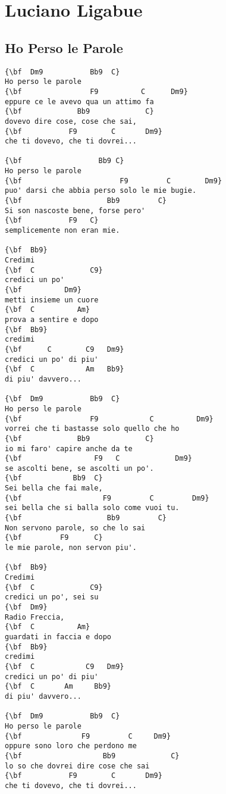 \documentclass[a4paper]{article}
\begin{document}
\section{Luciano Ligabue}
\subsection{Ho Perso le Parole}
\begin{multicols}{2}\begin{Verbatim}[commandchars=\\\{\}]
{\bf  Dm9           Bb9  C}
Ho perso le parole
{\bf                F9          C      Dm9}
eppure ce le avevo qua un attimo fa
{\bf             Bb9             C}
dovevo dire cose, cose che sai,
{\bf           F9        C       Dm9}
che ti dovevo, che ti dovrei...

{\bf                  Bb9 C}
Ho perso le parole
{\bf                       F9         C        Dm9}
puo' darsi che abbia perso solo le mie bugie.
{\bf                    Bb9         C}
Si son nascoste bene, forse pero'
{\bf           F9   C}
semplicemente non eran mie.

{\bf  Bb9}
Credimi
{\bf  C             C9}
credici un po'
{\bf          Dm9}
metti insieme un cuore
{\bf  C          Am}
prova a sentire e dopo
{\bf  Bb9}
credimi
{\bf      C        C9   Dm9}
credici un po' di piu'
{\bf  C            Am   Bb9}
di piu' davvero...

{\bf  Dm9           Bb9  C}
Ho perso le parole
{\bf                F9            C          Dm9}
vorrei che ti bastasse solo quello che ho
{\bf             Bb9             C}
io mi faro' capire anche da te
{\bf                 F9   C             Dm9}
se ascolti bene, se ascolti un po'.
{\bf   		    Bb9  C}
Sei bella che fai male,
{\bf                   F9         C         Dm9}
sei bella che si balla solo come vuoi tu.
{\bf                    Bb9         C}
Non servono parole, so che lo sai
{\bf         F9      C}
le mie parole, non servon piu'.

{\bf  Bb9}
Credimi
{\bf  C             C9}
credici un po', sei su
{\bf  Dm9}
Radio Freccia,
{\bf  C          Am}
guardati in faccia e dopo
{\bf  Bb9}
credimi
{\bf  C            C9   Dm9}
credici un po' di piu' 
{\bf  C       Am     Bb9}
di piu' davvero...

{\bf  Dm9           Bb9  C}
Ho perso le parole
{\bf              F9         C     Dm9}
oppure sono loro che perdono me
{\bf                   Bb9             C}
lo so che dovrei dire cose che sai
{\bf           F9        C       Dm9}
che ti dovevo, che ti dovrei...


\end{Verbatim}
\end{multicols}
\end{document}
